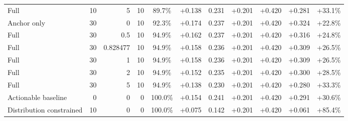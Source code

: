 \begin{table}[htbp]
\begin{tabular}{lrrrccccccc}
Full & 10 & 5 & 10 & 89.7\% & +0.138 & 0.231 & +0.201 & +0.420 & +0.281 & +33.1\% \\
Anchor only & 30 & 0 & 10 & 92.3\% & +0.174 & 0.237 & +0.201 & +0.420 & +0.324 & +22.8\% \\
Full & 30 & 0.5 & 10 & 94.9\% & +0.162 & 0.237 & +0.201 & +0.420 & +0.316 & +24.8\% \\
Full & 30 & 0.828477 & 10 & 94.9\% & +0.158 & 0.236 & +0.201 & +0.420 & +0.309 & +26.5\% \\
Full & 30 & 1 & 10 & 94.9\% & +0.158 & 0.236 & +0.201 & +0.420 & +0.309 & +26.5\% \\
Full & 30 & 2 & 10 & 94.9\% & +0.152 & 0.235 & +0.201 & +0.420 & +0.300 & +28.5\% \\
Full & 30 & 5 & 10 & 94.9\% & +0.138 & 0.230 & +0.201 & +0.420 & +0.280 & +33.3\% \\
Actionable baseline & 0 & 0 & 0 & 100.0\% & +0.154 & 0.241 & +0.201 & +0.420 & +0.291 & +30.6\% \\
Distribution constrained & 10 & 0 & 0 & 100.0\% & +0.075 & 0.142 & +0.201 & +0.420 & +0.061 & +85.4\% \\
\bottomrule
\end{tabular}
\end{table}